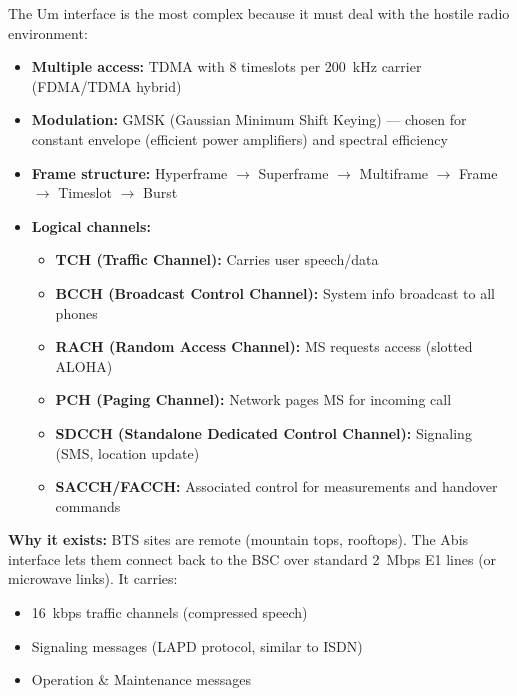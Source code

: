 The Um interface is the most complex because it must deal with the hostile radio environment:

\begin{itemize}
\tightlist
\item
  \textbf{Multiple access:} TDMA with 8 timeslots per 200~kHz carrier (FDMA/\allowbreak{}TDMA hybrid)
\item
  \textbf{Modulation:} GMSK (Gaussian Minimum Shift Keying) — chosen for constant envelope (efficient power amplifiers) and spectral efficiency
\item
  \textbf{Frame structure:} Hyperframe \ensuremath{\to} Superframe \ensuremath{\to} Multiframe \ensuremath{\to} Frame \ensuremath{\to} Timeslot \ensuremath{\to} Burst
\item
  \textbf{Logical channels:}

  \begin{itemize}
  \tightlist
  \item
    \textbf{TCH (Traffic Channel):} Carries user speech/\allowbreak{}data
  \item
    \textbf{BCCH (Broadcast Control Channel):} System info broadcast to all phones
  \item
    \textbf{RACH (Random Access Channel):} MS requests access (slotted ALOHA)
  \item
    \textbf{PCH (Paging Channel):} Network pages MS for incoming call
  \item
    \textbf{SDCCH (Standalone Dedicated Control Channel):} Signaling (SMS, location update)
  \item
    \textbf{SACCH/\allowbreak{}FACCH:} Associated control for measurements and handover commands
  \end{itemize}
\end{itemize}


\textbf{Why it exists:} BTS sites are remote (mountain tops, rooftops). The Abis interface lets them connect back to the BSC over standard 2~Mbps E1 lines (or microwave links). It carries:

\begin{itemize}
\tightlist
\item
  16~kbps traffic channels (compressed speech)
\item
  Signaling messages (LAPD protocol, similar to ISDN)
\item
  Operation \& Maintenance messages
\end{itemize}

